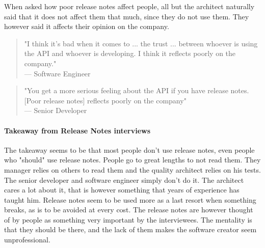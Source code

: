 \documentclass{article}
\begin{document}
When asked how poor release notes affect people, all but the architect naturally said that it does not affect them that much, since they do not use them. They however said it affects their opinion on the company.
\begin{quote}
"I think it's bad when it comes to ... the trust ... between whoever is using the API and whoever is developing. I think it reflects poorly on the company."\\
--- Software Engineer
\end{quote}
\begin{quote}
"You get a more serious feeling about the API if you have release notes. [Poor release notes] reflects poorly on the company"\\
--- Senior Developer
\end{quote}
\paragraph{Takeaway from Release Notes interviews}
The takeaway seems to be that most people don't use release notes, even people who "should" use release notes. People go to great lengths to not read them. They manager relies on others to read them and the quality architect relies on his tests. The senior developer and software engineer simply don't do it. The architect cares a lot about it, that is however something that years of experience has taught him. Release notes seem to be used more as a last resort when something breaks, as is to be avoided at every cost. The release notes are however thought of by people as something very important by the interviewees. The mentality is that they should be there, and the lack of them makes the software creator seem unprofessional.
\end{document}
